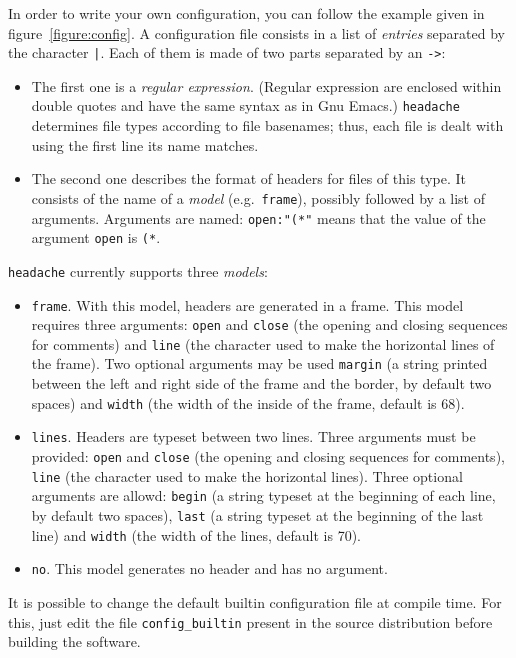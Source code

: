 \documentclass{article}
\newcommand{\headache}{\texttt{headache}}
\begin{document}
In order to write your own configuration, you can follow the example
given in figure~\ref{figure:config}.  A configuration file consists in
a list of \emph{entries} separated by the character \verb+|+.  Each
of them is made of two parts separated by an \verb+->+:
\begin{itemize}
\item The first one is a \emph{regular expression}.  (Regular
  expression are enclosed within double quotes and have the same
  syntax as in Gnu Emacs.)  \headache{} determines file types according to
  file basenames; thus, each file is dealt with using the first line
  its name matches.
\item The second one describes the format of headers for files of this
  type.  It consists of the name of a \emph{model} (e.g.\ 
  \verb+frame+), possibly followed by a list of arguments.  Arguments
  are named: \verb+open:"(*"+ means that the value of the argument
  \verb+open+ is \verb+(*+.
\end{itemize}
\headache{} currently supports three \emph{models}:
\begin{itemize}
\item \verb+frame+.  With this model, headers are generated in a
  frame.  This model requires three arguments: \verb+open+ and
  \verb+close+ (the opening and closing sequences for comments) and
  \verb+line+ (the character used to make the horizontal lines of the
  frame).  Two optional arguments may be used \verb+margin+ (a string
  printed between the left and right side of the frame and the border,
  by default two spaces) and \verb+width+ (the width of the inside of
  the frame, default is 68).
\item \verb+lines+.  Headers are typeset between two lines.  Three
  arguments must be provided: \verb+open+ and \verb+close+ (the
  opening and closing sequences for comments), \verb+line+ (the
  character used to make the horizontal lines).  Three optional
  arguments are allowd: \verb+begin+ (a string typeset at the
  beginning of each line, by default two spaces), \verb+last+ (a
  string typeset at the beginning of the last line) and \verb+width+
  (the width of the lines, default is 70).
\item \verb+no+.  This model generates no header and has no argument.
\end{itemize}

It is possible to change the default builtin configuration file at
compile time.  For this, just edit the file \verb+config_builtin+
present in the source distribution before building the software.
\end{document}
